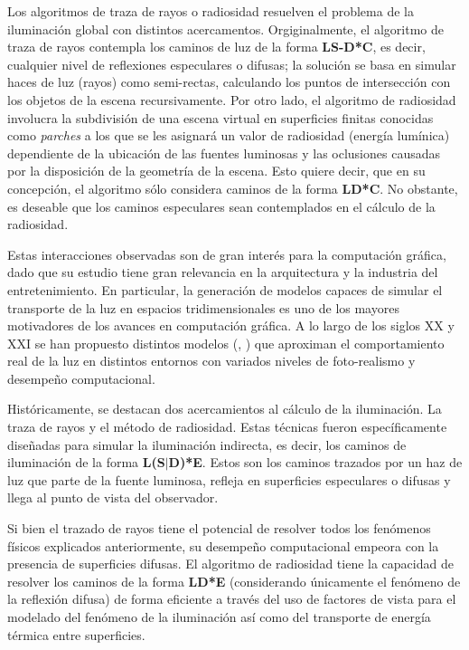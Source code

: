 Los algoritmos de traza de rayos o radiosidad resuelven el problema de la iluminación global con distintos acercamentos. Orgiginalmente, el algoritmo de traza de rayos contempla los caminos de luz de la forma \textbf{L{S-D}*C}, es decir, cualquier nivel de reflexiones especulares o difusas; la solución se basa en simular haces de luz (rayos) como semi-rectas, calculando los puntos de intersección con los objetos de la escena recursivamente. Por otro lado, el algoritmo de radiosidad involucra la subdivisión de una escena virtual en superficies finitas conocidas como \textit{parches} a los que se les asignará un valor de radiosidad (energía lumínica) dependiente de la ubicación de las fuentes luminosas y las oclusiones causadas por la disposición de la geometría de la escena. Esto quiere decir, que en su concepción, el algoritmo sólo considera caminos de la forma \textbf{L{D}*C}. No obstante, es deseable que los caminos especulares sean contemplados en el cálculo de la radiosidad.

Estas interacciones observadas son de gran interés para la computación gráfica, dado que su estudio tiene gran relevancia en la arquitectura y la industria del entretenimiento. En particular, la generación de modelos capaces de simular el transporte de la luz en espacios tridimensionales es uno de los mayores motivadores de los avances en computación gráfica. A lo largo de los siglos XX y XXI se han propuesto distintos modelos (\cite{Kajiya}, \cite{Cohen}) que aproximan el comportamiento real de la luz en distintos entornos con variados niveles de foto-realismo y desempeño computacional.

Históricamente, se destacan dos acercamientos al cálculo de la iluminación. La traza de rayos y el método de radiosidad. Estas técnicas fueron específicamente diseñadas para simular la iluminación indirecta, es decir, los caminos de iluminación de la forma \textbf{L(S$|$D)*E}. Estos son los caminos trazados por un haz de luz que parte de la fuente luminosa, refleja en superficies especulares o difusas y llega al punto de vista del observador. 

Si bien el trazado de rayos tiene el potencial de resolver todos los fenómenos físicos explicados anteriormente, su desempeño computacional empeora con la presencia de superficies difusas. El algoritmo de radiosidad tiene la capacidad de resolver los caminos de la forma \textbf{LD*E} (considerando únicamente el fenómeno de la reflexión difusa) de forma eficiente a través del uso de factores de vista para el modelado del fenómeno de la iluminación así como del transporte de energía térmica entre superficies.

